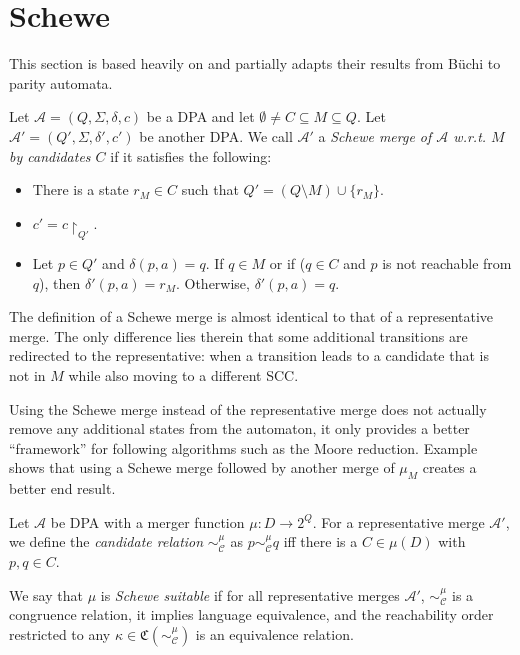 
\section{Schewe}
\label{sect:schewe}

This section is based heavily on \cite{Schewe2010} and partially adapts their results from B\"uchi to parity automata.

\begin{defn}
		Let $\mathcal{A} = (Q, \Sigma, \delta, c)$ be a DPA and let $\emptyset \neq C \subseteq M \subseteq Q$. Let $\mathcal{A}' = (Q', \Sigma, \delta', c')$ be another DPA. We call $\mathcal{A}'$ a \emph{Schewe merge of $\mathcal{A}$ w.r.t. $M$ by candidates $C$} if it satisfies the following:
	\begin{itemize}
		\item There is a state $r_M \in C$ such that $Q' = (Q \setminus M) \cup \{r_M\}$.
		\item $c' = c\upharpoonright_{Q'}$.
		\item Let $p \in Q'$ and $\delta(p, a) = q$. If $q \in M$ or if ($q \in C$ and $p$ is not reachable from $q$), then $\delta'(p, a) = r_M$. Otherwise, $\delta'(p, a) = q$. 
	\end{itemize}
\end{defn}

The definition of a Schewe merge is almost identical to that of a representative merge. The only difference lies therein that some additional transitions are redirected to the representative: when a transition leads to a candidate that is not in $M$ while also moving to a different SCC.

Using the Schewe merge instead of the representative merge does not actually remove any additional states from the automaton, it only provides a better \enquote{framework} for following algorithms such as the Moore reduction. Example %
shows that using a Schewe merge followed by another merge of $\mu_M$ creates a better end result.

\begin{defn}
	Let $\mathcal{A}$ be DPA with a merger function $\mu : D \rightarrow 2^Q$. For a representative merge $\mathcal{A}'$, we define the \emph{candidate relation} $\sim_\mathcal{C}^\mu$ as $p \sim_\mathcal{C}^\mu q$ iff there is a $C \in \mu(D)$ with $p, q \in C$.
	
	We say that $\mu$ is \emph{Schewe suitable} if for all representative merges $\mathcal{A}'$, $\sim_\mathcal{C}^\mu$ is a congruence relation, it implies language equivalence, and the reachability order restricted to any $\kappa \in \mathfrak{C}(\sim_\mathcal{C}^\mu)$ is an equivalence relation.
\end{defn}


